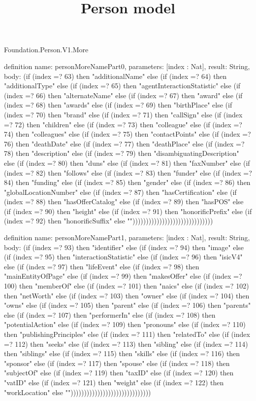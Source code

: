 \begin{lexlean}{Foundation.Person.V1.More}
\title{Person model}
\begin{semanticmodule}
definition{
  name: personMoreNamePart0,
  parameters: [index : Nat],
  result: String,
  body: (if (index =? 63) then "additionalName" else (if (index =? 64) then "additionalType" else (if (index =? 65) then "agentInteractionStatistic" else (if (index =? 66) then "alternateName" else (if (index =? 67) then "award" else (if (index =? 68) then "awards" else (if (index =? 69) then "birthPlace" else (if (index =? 70) then "brand" else (if (index =? 71) then "callSign" else (if (index =? 72) then "children" else (if (index =? 73) then "colleague" else (if (index =? 74) then "colleagues" else (if (index =? 75) then "contactPoints" else (if (index =? 76) then "deathDate" else (if (index =? 77) then "deathPlace" else (if (index =? 78) then "description" else (if (index =? 79) then "disambiguatingDescription" else (if (index =? 80) then "duns" else (if (index =? 81) then "faxNumber" else (if (index =? 82) then "follows" else (if (index =? 83) then "funder" else (if (index =? 84) then "funding" else (if (index =? 85) then "gender" else (if (index =? 86) then "globalLocationNumber" else (if (index =? 87) then "hasCertification" else (if (index =? 88) then "hasOfferCatalog" else (if (index =? 89) then "hasPOS" else (if (index =? 90) then "height" else (if (index =? 91) then "honorificPrefix" else (if (index =? 92) then "honorificSuffix" else ""))))))))))))))))))))))))))))))
}

definition{
  name: personMoreNamePart1,
  parameters: [index : Nat],
  result: String,
  body: (if (index =? 93) then "identifier" else (if (index =? 94) then "image" else (if (index =? 95) then "interactionStatistic" else (if (index =? 96) then "isicV4" else (if (index =? 97) then "lifeEvent" else (if (index =? 98) then "mainEntityOfPage" else (if (index =? 99) then "makesOffer" else (if (index =? 100) then "memberOf" else (if (index =? 101) then "naics" else (if (index =? 102) then "netWorth" else (if (index =? 103) then "owner" else (if (index =? 104) then "owns" else (if (index =? 105) then "parent" else (if (index =? 106) then "parents" else (if (index =? 107) then "performerIn" else (if (index =? 108) then "potentialAction" else (if (index =? 109) then "pronouns" else (if (index =? 110) then "publishingPrinciples" else (if (index =? 111) then "relatedTo" else (if (index =? 112) then "seeks" else (if (index =? 113) then "sibling" else (if (index =? 114) then "siblings" else (if (index =? 115) then "skills" else (if (index =? 116) then "sponsor" else (if (index =? 117) then "spouse" else (if (index =? 118) then "subjectOf" else (if (index =? 119) then "taxID" else (if (index =? 120) then "vatID" else (if (index =? 121) then "weight" else (if (index =? 122) then "workLocation" else ""))))))))))))))))))))))))))))))
}


\end{semanticmodule}
\end{lexlean}

